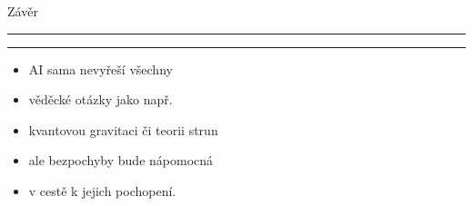 \documentclass[aspectratio=43]{beamer}
\def\vs{\vspace{-2mm}}
\def\lend{\phantom{g}\vspace{1.5mm}\hrule\hrule}
\begin{document}
\begin{frame}{\vs Závěr \lend}
\vspace{-3mm}
\begin{itemize}
    \small
    \item[] AI sama nevyřeší všechny\\ \vspace{2mm} 
    \item[] věděcké otázky jako např.\\ \vspace{2mm} 
    \item[] kvantovou gravitaci či teorii strun\\ \vspace{2mm}
    \item[] ale bezpochyby bude nápomocná\\ \vspace{2mm}
    \item[] v cestě k jejich pochopení.
\end{itemize}
\end{frame}
\end{document}
